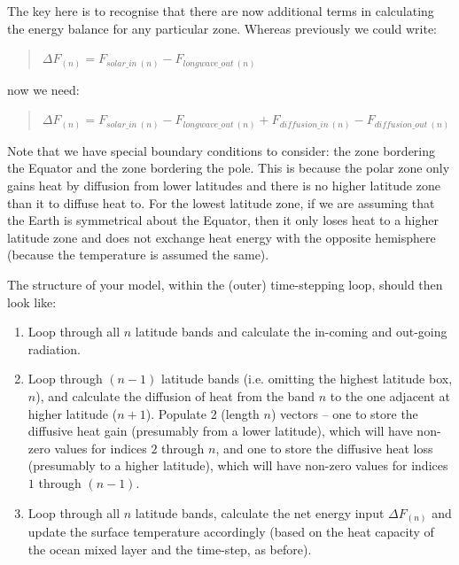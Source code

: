 \documentclass{tufte-book} %
\newenvironment{docspec}{\begin{quotation}\ttfamily\parskip0pt\parindent0pt\ignorespaces}{\end{quotation}}
\begin{document}
The key here is to recognise that there are now additional terms  in calculating the energy balance for any particular zone. Whereas previously we could write:
\begin{docspec}
\(\Delta F_{(n)}=F_{solar\_in\:(n)}-F_{longwave\_out\:(n)}\)
\end{docspec}
\noindent now we need:
\begin{docspec}
\(\Delta F_{(n)}=F_{solar\_in\:(n)}-F_{longwave\_out\:(n)}+F_{diffusion\_in\:(n)}-F_{diffusion\_out\:(n)}\)
\end{docspec}

\noindent Note that we have special boundary conditions to consider: the zone bordering the Equator and the zone bordering the pole. This is because the polar zone only gains heat by diffusion from lower latitudes and there is no higher latitude zone than it to diffuse heat to. For the lowest latitude zone, if we are assuming that the Earth is symmetrical about the Equator, then it only loses heat to a higher latitude zone and does not exchange heat energy with the opposite hemisphere (because the temperature is assumed the same).

The structure of your model, within the (outer) time-stepping loop, should then look like:

\begin{enumerate}[noitemsep]
\setlength{\itemindent}{.2in}
\item Loop through all \(n\) latitude bands and calculate the in-coming and out-going radiation.
\item Loop through \((n-1)\) latitude bands (i.e. omitting the highest latitude box, \(n\)), and calculate the diffusion of heat from the band \(n\) to the one adjacent at higher latitude (\(n+1\)). Populate 2 (length \(n\)) vectors -- one to store the diffusive heat gain (presumably from a lower latitude), which will have non-zero values for indices \(2\) through \(n\), and one to store the diffusive heat loss (presumably to a higher latitude), which will have non-zero values for indices \(1\) through \((n-1)\).
\item Loop through all \(n\) latitude bands, calculate the net energy input \(\Delta F_{(n)}\) and update the surface temperature accordingly (based on the heat capacity of the ocean mixed layer and the time-step, as before).
\end{enumerate}

\end{document}
